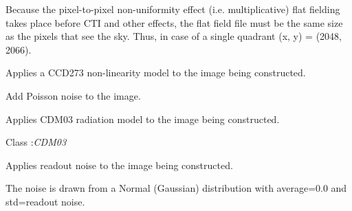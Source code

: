 \documentclass[a4paper,11pt,english]{sphinxmanual}
\begin{document}
\begin{fulllineitems}
\begin{fulllineitems}
Because the pixel-to-pixel non-uniformity effect (i.e. multiplicative) flat fielding takes place
before CTI and other effects, the flat field file must be the same size as the pixels that see
the sky. Thus, in case of a single quadrant (x, y) = (2048, 2066).

\end{fulllineitems}


\begin{fulllineitems}
\label{simulator:simulator.simulator.VISsimulator.applyNonlinearity}
Applies a CCD273 non-linearity model to the image being constructed.

\end{fulllineitems}


\begin{fulllineitems}
\label{simulator:simulator.simulator.VISsimulator.applyPoissonNoise}
Add Poisson noise to the image.

\end{fulllineitems}


\begin{fulllineitems}
\label{simulator:simulator.simulator.VISsimulator.applyRadiationDamage}
Applies CDM03 radiation model to the image being constructed.




Class :\emph{CDM03}



\end{fulllineitems}


\begin{fulllineitems}
\label{simulator:simulator.simulator.VISsimulator.applyReadoutNoise}
Applies readout noise to the image being constructed.

The noise is drawn from a Normal (Gaussian) distribution with average=0.0 and std=readout noise.


\end{fulllineitems}
\end{fulllineitems}
\end{document}
